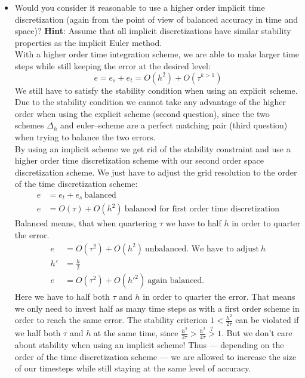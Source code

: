 \documentclass[12pt,a4paper]{scrreprt}
\begin{document}
\begin{itemize}
\item Would you consider it reasonable to use a higher order implicit time discretization (again from the point of view of balanced accuracy in time and space)?\newline
\textbf{Hint}: Assume that all implicit discretizations have similar stability properties as the implicit Euler method.\\
{\footnotesize
With a higher order time integration scheme, we are able to make larger time steps while still keeping the error at the desired level: $$e=e_s+e_t=O\left(h^2\right)+O\left(\tau^{k>1}\right)$$
We still have to satisfy the stability condition when using an explicit scheme. Due to the stability condition we cannot take any advantage of the higher order when using the explicit scheme  (second question), since the two schemes $\Delta_h$ and euler--scheme are a perfect matching pair (third question) when trying to balance the two errors.\\
By using an implicit scheme we get rid of the stability constraint and use a higher order time discretization scheme with our second order space discretization scheme. We just have to adjust the grid resolution to the order of the time discretization scheme:
\begin{align*}
e
&
=e_t+e_s\ \text{balanced}
\\
e
&
=O\left(\tau\right)+O\left(h^2\right)\ \text{balanced for first order time discretization}
\end{align*}
Balanced means, that when quartering $\tau$ we have to half $h$ in order to quarter the error.
\begin{align*}
e
&
=O\left(\tau^2\right)+O\left(h^2\right)\ \text{unbalanced. We have to adjust}\ h
\\
h'
&
=\frac{h}{2}
\\
e
&
=O\left(\tau^2\right)+O\left(h'^2\right)\ \text{again balanced.}
\end{align*}
Here we have to half both $\tau$ and $h$ in order to quarter the error. That means we only need to invest half as many time steps as with a first order scheme in order to reach the same error. The stability criterion $1<\frac{h^2}{2\tau}$ can be violated if we half both $\tau$ and $h$ at the same time, since $\frac{h^2}{2\tau}>\frac{h^2}{4\tau}\overset{?}{>}1$. But we don't care about stability when using an implicit scheme! Thus --- depending on the order of the time discretization scheme --- we are allowed to increase the size of our timesteps while still staying at the same level of accuracy.
}
\end{itemize}
\end{document}
